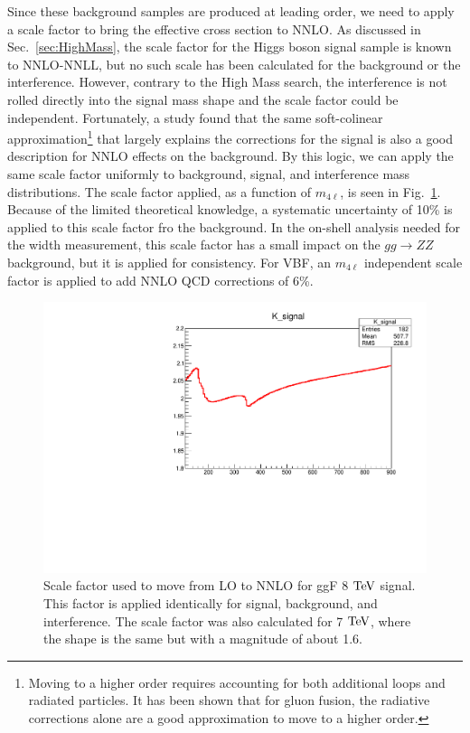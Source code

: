 Since these background samples are produced at leading order, we need to apply a scale factor to bring the effective cross section to NNLO. As discussed in Sec.~\ref{sec:HighMass}, the scale factor for the Higgs boson signal sample is known to NNLO-NNLL, but no such scale has been calculated for the background or the interference. However, contrary to the High Mass search, the interference is not rolled directly into the signal mass shape and the scale factor could be independent. Fortunately, a study \cite{Bonvini:1304.3053} found that the same soft-colinear approximation\footnote{Moving to a higher order requires accounting for both additional loops and radiated particles. It has been shown \cite{Kramer:1998} that for gluon fusion, the radiative corrections alone are a good approximation to move to a higher order.} that largely explains the corrections for the signal is also a good description for NNLO effects on the background. By this logic, we can apply the same scale factor uniformly to background, signal, and interference mass distributions. The scale factor applied, as a function of $m_{4\ell}$, is seen in Fig.~\ref{fig:KFactorggF}. Because of the limited theoretical knowledge, a systematic uncertainty of 10\% is applied to this scale factor fro the background. In the on-shell analysis needed for the width measurement, this scale factor has a small impact on the $gg\rightarrow ZZ$ background, but it is applied for consistency. For VBF, an $m_{4\ell}$ independent scale factor is applied to add NNLO QCD corrections of 6\%.

\begin{figure}[htbp]
\begin{center}
\includegraphics[width=.5\linewidth]{HiggsProperties/figures/kfactorpassa.pdf}
\caption[NNLO/LO Scale Factor at 8 $\rm{TeV}$ for ggF Signal]{Scale factor used to move from LO to NNLO for ggF 8 $\rm{TeV}$ signal. This factor is applied identically for signal, background, and interference. The scale factor was also calculated for 7 $\rm{TeV}$, where the shape is the same but with a magnitude of about 1.6.}
\label{fig:KFactorggF}
\end{center}
\end{figure}

